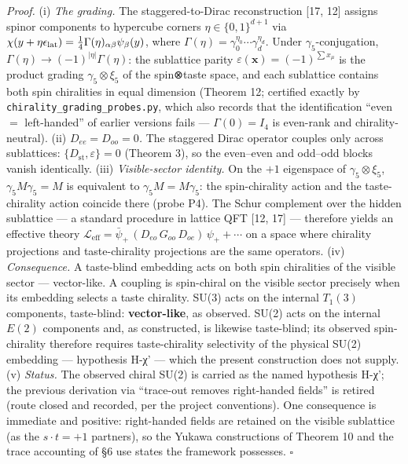 \documentclass[
]{article}
\begin{document}
\emph{Proof.} (i) \emph{The grading.} The staggered-to-Dirac
reconstruction {[}17, 12{]} assigns spinor components to hypercube
corners \(\eta \in \{0,1\}^{d+1}\) via
\(\chi(y + \eta\epsilon_{\rm lat}) = \frac{1}{4}\Gamma(\eta)_{\alpha\beta}\psi_\beta(y)\),
where \(\Gamma(\eta) = \gamma_0^{\eta_0}\cdots\gamma_d^{\eta_d}\). Under
\(\gamma_5\)-conjugation,
\(\Gamma(\eta) \to (-1)^{|\eta|}\Gamma(\eta)\): the sublattice parity
\(\varepsilon(\mathbf{x}) = (-1)^{\sum x_\mu}\) is the product grading
\(\gamma_5 \otimes \xi_5\) of the spin⊗taste space, and each sublattice
contains both spin chiralities in equal dimension (Theorem 12; certified
exactly by \texttt{chirality\_grading\_probes.py}, which also records
that the identification ``even \(=\) left-handed'' of earlier versions
fails --- \(\Gamma(0) = I_4\) is even-rank and chirality-neutral). (ii)
\emph{\(D_{ee} = D_{oo} = 0\).} The staggered Dirac operator couples
only across sublattices: \(\{D_{\text{st}}, \varepsilon\} = 0\) (Theorem
3), so the even--even and odd--odd blocks vanish identically. (iii)
\emph{Visible-sector identity.} On the \(+1\) eigenspace of
\(\gamma_5 \otimes \xi_5\), \(\gamma_5 M \gamma_5 = M\) is equivalent to
\(\gamma_5 M = M \gamma_5\): the spin-chirality action and the
taste-chirality action coincide there (probe P4). The Schur complement
over the hidden sublattice --- a standard procedure in lattice QFT
{[}12, 17{]} --- therefore yields an effective theory
\(\mathcal{L}_{\text{eff}} = \bar{\psi}_+\,(D_{eo}\,G_{oo}\,D_{oe})\,\psi_+ + \cdots\)
on a space where chirality projections and taste-chirality projections
are the same operators. (iv) \emph{Consequence.} A taste-blind embedding
acts on both spin chiralities of the visible sector --- vector-like. A
coupling is spin-chiral on the visible sector precisely when its
embedding selects a taste chirality. SU(3) acts on the internal
\(T_1(3)\) components, taste-blind: \textbf{vector-like}, as observed.
SU(2) acts on the internal \(E(2)\) components and, as constructed, is
likewise taste-blind; its observed spin-chirality therefore requires
taste-chirality selectivity of the physical SU(2) embedding ---
hypothesis H-χ' --- which the present construction does not supply. (v)
\emph{Status.} The observed chiral SU(2) is carried as the named
hypothesis H-χ'; the previous derivation via ``trace-out removes
right-handed fields'' is retired (route closed and recorded, per the
project conventions). One consequence is immediate and positive:
right-handed fields are retained on the visible sublattice (as the
\(s \cdot t = +1\) partners), so the Yukawa constructions of Theorem 10
and the trace accounting of §6 use states the framework possesses.
\(\square\)
\end{document}
